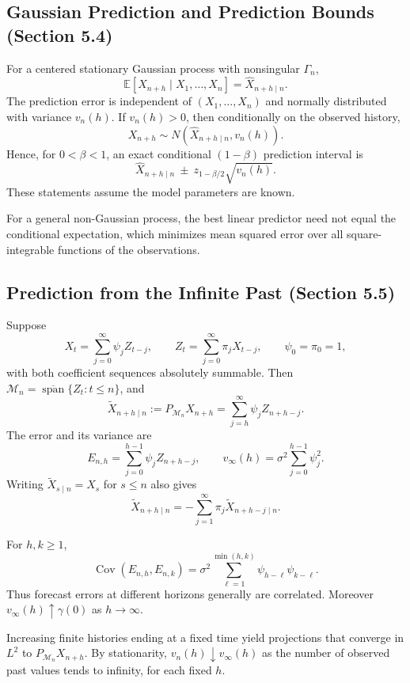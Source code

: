 \subsection{Gaussian Prediction and Prediction Bounds (Section 5.4)}
\begin{theorem}
For a centered stationary Gaussian process with nonsingular $\Gamma_n$,
\[
\mathbb E[X_{n+h}\mid X_1,\ldots,X_n]=\widehat X_{n+h\mid n}.
\]
The prediction error is independent of $(X_1,\ldots,X_n)$ and normally
distributed with variance $v_n(h)$. If $v_n(h)>0$, then conditionally on
the observed history,
\[
X_{n+h}\sim N(\widehat X_{n+h\mid n},v_n(h)).
\]
Hence, for $0<\beta<1$, an exact conditional $(1-\beta)$ prediction interval is
\[
\widehat X_{n+h\mid n}\ \pm\ z_{1-\beta/2}\sqrt{v_n(h)}.
\]
These statements assume the model parameters are known.
\end{theorem}
For a general non-Gaussian process, the best linear predictor need not equal
the conditional expectation, which minimizes mean squared error over all
square-integrable functions of the observations.

\subsection{Prediction from the Infinite Past (Section 5.5)}
\begin{theorem}
Suppose
\[
X_t=\sum_{j=0}^{\infty}\psi_jZ_{t-j},\qquad
Z_t=\sum_{j=0}^{\infty}\pi_jX_{t-j},\qquad\psi_0=\pi_0=1,
\]
with both coefficient sequences absolutely summable. Then
$\mathcal M_n=\overline{\operatorname{span}}\{Z_t:t\le n\}$, and
\[
\widetilde X_{n+h\mid n}:=P_{\mathcal M_n}X_{n+h}
=\sum_{j=h}^{\infty}\psi_jZ_{n+h-j}.
\]
The error and its variance are
\[
E_{n,h}=\sum_{j=0}^{h-1}\psi_jZ_{n+h-j},\qquad
v_\infty(h)=\sigma^2\sum_{j=0}^{h-1}\psi_j^2.
\]
Writing $\widetilde X_{s\mid n}=X_s$ for $s\le n$ also gives
\[
\widetilde X_{n+h\mid n}=-\sum_{j=1}^{\infty}\pi_j
\widetilde X_{n+h-j\mid n}.
\]
\end{theorem}
\begin{proposition}
For $h,k\ge1$,
\[
\operatorname{Cov}(E_{n,h},E_{n,k})
=\sigma^2\sum_{\ell=1}^{\min(h,k)}\psi_{h-\ell}\psi_{k-\ell}.
\]
Thus forecast errors at different horizons generally are correlated.
Moreover $v_\infty(h)\uparrow\gamma(0)$ as $h\to\infty$.
\end{proposition}
Increasing finite histories ending at a fixed time yield projections that
converge in $L^2$ to $P_{\mathcal M_n}X_{n+h}$.
By stationarity, $v_n(h)\downarrow v_\infty(h)$ as the number of observed
past values tends to infinity, for each fixed $h$.

